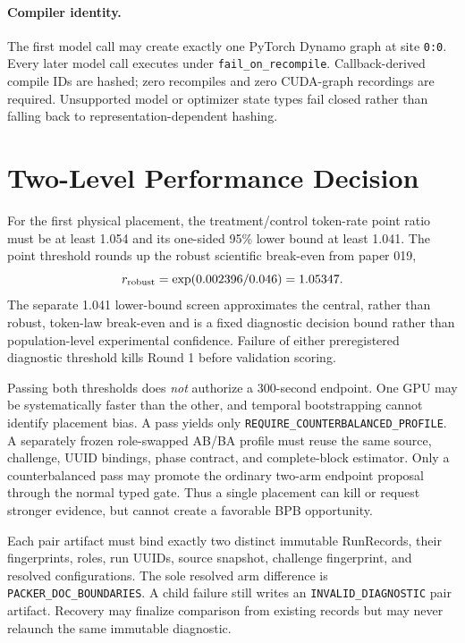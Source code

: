 \documentclass{article}
\begin{document}
\paragraph{Compiler identity.}
The first model call may create exactly one PyTorch Dynamo graph at site
\texttt{0:0}.  Every later model call executes under
\texttt{fail\_on\_recompile}.  Callback-derived compile IDs are hashed; zero
recompiles and zero CUDA-graph recordings are required.  Unsupported model or
optimizer state types fail closed rather than falling back to
representation-dependent hashing.

\section{Two-Level Performance Decision}

For the first physical placement, the treatment/control token-rate point
ratio must be at least 1.054 and its one-sided 95\% lower bound at least
1.041.  The point threshold rounds up the robust scientific break-even from
paper 019,
\[
r_{\rm robust}
=\exp(0.002396/0.046)=1.05347.
\]
The separate 1.041 lower-bound screen approximates the central, rather than
robust, token-law break-even and is a fixed diagnostic decision bound rather
than population-level experimental confidence.
Failure of either preregistered diagnostic threshold kills Round 1 before
validation scoring.

Passing both thresholds does \emph{not} authorize a 300-second endpoint.
One GPU may be systematically faster than the other, and temporal
bootstrapping cannot identify placement bias.  A pass yields only
\texttt{REQUIRE\_COUNTERBALANCED\_PROFILE}.  A separately frozen role-swapped
AB/BA profile must reuse the same source, challenge, UUID bindings, phase
contract, and complete-block estimator.  Only a counterbalanced pass may
promote the ordinary two-arm endpoint proposal through the normal typed gate.
Thus a single placement can kill or request stronger evidence, but cannot
create a favorable BPB opportunity.

Each pair artifact must bind exactly two distinct immutable RunRecords, their
fingerprints, roles, run UUIDs, source snapshot, challenge fingerprint, and
resolved configurations.  The sole resolved arm difference is
\texttt{PACKER\_DOC\_BOUNDARIES}.  A child failure still writes an
\texttt{INVALID\_DIAGNOSTIC} pair artifact.  Recovery may finalize comparison
from existing records but may never relaunch the same immutable diagnostic.
\end{document}
